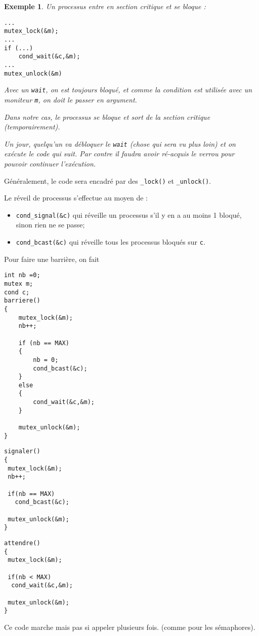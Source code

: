 \documentclass[12pt,a4paper]{report}
\newtheorem*{ex}{Exemple}
\begin{document}
\begin{ex}
  Un processus entre en section critique et se bloque :
  \begin{center}
\begin{verbatim}
...
mutex_lock(&m);
...
if (...)
    cond_wait(&c,&m);
...
mutex_unlock(&m)
\end{verbatim}
  \end{center}

Avec un \verb?wait?, on est toujours bloqué, et comme la condition est utilisée avec un moniteur \verb?m?, on doit le passer en argument.

Dans notre cas, le processus se bloque et sort de la section critique (temporairement).

Un jour, quelqu'un va débloquer le \verb?wait? (chose qui sera vu plus loin) et on exécute le code qui suit. Par contre il faudra avoir ré-acquis le verrou pour pouvoir continuer l'exécution.
\end{ex}

Généralement, le code sera encadré par des \verb?_lock()? et \verb?_unlock()?.

Le réveil de processus s'effectue au moyen de :
\begin{itemize}
\item \verb?cond_signal(&c)? qui réveille un processus s'il y en a au moins 1 bloqué, sinon rien ne se passe;
\item \verb?cond_bcast(&c)? qui réveille tous les processus bloqués sur \texttt{c}.
\end{itemize}

Pour faire une barrière, on fait

\begin{center}
\begin{verbatim}
int nb =0;
mutex m;
cond c;
barriere()
{
    mutex_lock(&m);
    nb++;

    if (nb == MAX)
    {
        nb = 0;
        cond_bcast(&c);
    }
    else
    {
        cond_wait(&c,&m);
    }

    mutex_unlock(&m);
}
\end{verbatim}
\end{center}

\begin{minipage}{0.6\linewidth}
\begin{verbatim}
signaler()
{
 mutex_lock(&m);
 nb++;

 if(nb == MAX)
   cond_bcast(&c);

 mutex_unlock(&m);
}
\end{verbatim}
\end{minipage}
\begin{minipage}{0.6\linewidth}
\begin{verbatim}
attendre()
{
 mutex_lock(&m);

 if(nb < MAX)
  cond_wait(&c,&m);

 mutex_unlock(&m);
}
\end{verbatim}
\end{minipage}
Ce code marche mais pas si appeler plusieurs fois. (comme pour les sémaphores).\\
\end{document}
